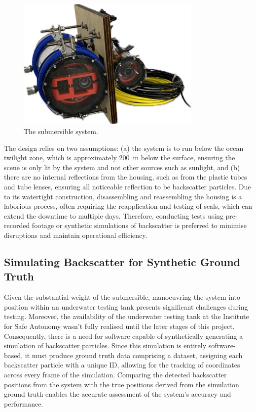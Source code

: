 \begin{figure}[H]
    \centering
    \includegraphics[width=0.8\textwidth]{assets/submersible.png}
    \caption{The submersible system.}
    \label{fig:submersible}
\end{figure}

The design relies on two assumptions: (a) the system is to run below the ocean twilight zone, which is approximately \SI{200}{\metre} below the surface, ensuring the scene is only lit by the system and not other sources such as sunlight, and (b) there are no internal reflections from the housing, such as from the plastic tubes and tube lenses, ensuring all noticeable reflection to be backscatter particles. Due to its watertight construction, disassembling and reassembling the housing is a laborious process, often requiring the reapplication and testing of seals, which can extend the downtime to multiple days. Therefore, conducting tests using pre-recorded footage or synthetic simulations of backscatter is preferred to minimise disruptions and maintain operational efficiency.

\subsection{Simulating Backscatter for Synthetic Ground Truth}
\label{designsim}

Given the substantial weight of the submersible, manoeuvring the system into position within an underwater testing tank presents significant challenges during testing. Moreover, the availability of the underwater testing tank at the Institute for Safe Autonomy wasn't fully realised until the later stages of this project. Consequently, there is a need for software capable of synthetically generating a simulation of backscatter particles. Since this simulation is entirely software-based, it must produce ground truth data comprising a dataset, assigning each backscatter particle with a unique ID, allowing for the tracking of coordinates across every frame of the simulation. Comparing the detected backscatter positions from the system with the true positions derived from the simulation ground truth enables the accurate assessment of the system's accuracy and performance.

